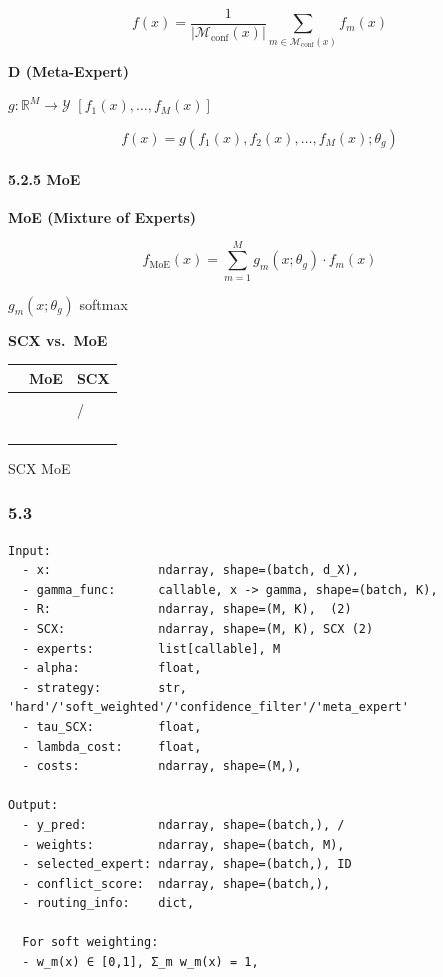 \documentclass[
  12pt,
]{article}
\begin{document}
\[
f(x) = \frac{1}{|\mathcal{M}_{\text{conf}}(x)|} \sum_{m \in \mathcal{M}_{\text{conf}}(x)} f_m(x)
\]

\textbf{ D (Meta-Expert)}

 \(g: \mathbb{R}^M \to \mathcal{Y}\)
\([f_1(x), \dots, f_M(x)]\) 

\[
f(x) = g(f_1(x), f_2(x), \dots, f_M(x); \theta_g)
\]

\paragraph{5.2.5  MoE
}\label{ux4e0e-moe-ux7684ux5173ux7cfbux548cux533aux522b}

\textbf{ MoE (Mixture of Experts)}

\[
f_{\text{MoE}}(x) = \sum_{m=1}^M g_m(x; \theta_g) \cdot f_m(x)
\]

 \(g_m(x; \theta_g)\)  softmax


\textbf{SCX  vs.~MoE }

\begin{longtable}[]{@{}lll@{}}
\toprule\noalign{}
 & MoE  & SCX  \\
\midrule\noalign{}
\endhead
\bottomrule\noalign{}
\endlastfoot
 &  &  \\
 &  & / \\
 &  &  \\
 &  &  \\
 &  &  \\
 &  &  \\
\end{longtable}

\textbf{}SCX  MoE
\textbf{}\textbf{}

\subsubsection{5.3
}\label{ux8f93ux5165ux8f93ux51faux89c4ux8303-4}

\begin{verbatim}
Input:
  - x:               ndarray, shape=(batch, d_X), 
  - gamma_func:      callable, x -> gamma, shape=(batch, K), 
  - R:               ndarray, shape=(M, K),  (2)
  - SCX:             ndarray, shape=(M, K), SCX (2)
  - experts:         list[callable], M 
  - alpha:           float, 
  - strategy:        str, 'hard'/'soft_weighted'/'confidence_filter'/'meta_expert'
  - tau_SCX:         float, 
  - lambda_cost:     float, 
  - costs:           ndarray, shape=(M,), 

Output:
  - y_pred:          ndarray, shape=(batch,), /
  - weights:         ndarray, shape=(batch, M), 
  - selected_expert: ndarray, shape=(batch,), ID
  - conflict_score:  ndarray, shape=(batch,), 
  - routing_info:    dict, 

  For soft weighting:
  - w_m(x) ∈ [0,1], Σ_m w_m(x) = 1, 
\end{verbatim}
\end{document}

